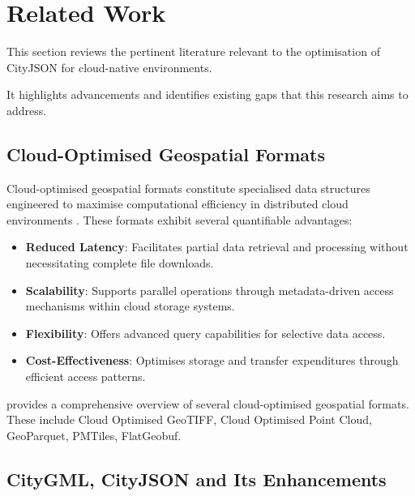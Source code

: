 
\chapter{Related Work}
\label{rw:related_work}

This section reviews the pertinent literature relevant to the optimisation of CityJSON for cloud-native environments.

It highlights advancements and identifies existing gaps that this research aims to address.

\section{Cloud-Optimised Geospatial Formats}
\label{rw:cloud_optimised_formats}

Cloud-optimised geospatial formats constitute specialised data structures engineered to maximise computational efficiency in distributed cloud environments \citep{cloud-optimised-formats}.
These formats exhibit several quantifiable advantages:

\begin{itemize}
  \item \textbf{Reduced Latency}: Facilitates partial data retrieval and processing without necessitating complete file downloads.
  \item \textbf{Scalability}: Supports parallel operations through metadata-driven access mechanisms within cloud storage systems.
  \item \textbf{Flexibility}: Offers advanced query capabilities for selective data access.
  \item \textbf{Cost-Effectiveness}: Optimises storage and transfer expenditures through efficient access patterns.
\end{itemize}

\citet{cloud-optimised-formats} provides a comprehensive overview of several cloud-optimised geospatial formats.
These include Cloud Optimised GeoTIFF, Cloud Optimised Point Cloud, GeoParquet, PMTiles, FlatGeobuf.

\section{CityGML, CityJSON and Its Enhancements}
\label{rw:cityjson_enhancements}

